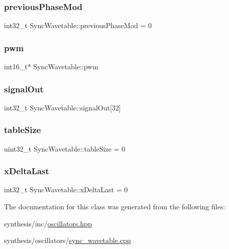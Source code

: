 \subsubsection{\texorpdfstring{previous\+Phase\+Mod}{previousPhaseMod}}
{\footnotesize\ttfamily int32\+\_\+t Sync\+Wavetable\+::previous\+Phase\+Mod = 0\hspace{0.3cm}{\ttfamily [private]}}

\mbox{\label{class_sync_wavetable_a7a7fed16ef7013e5543616df1c4343a4}} 
\subsubsection{\texorpdfstring{pwm}{pwm}}
{\footnotesize\ttfamily int16\+\_\+t$\ast$ Sync\+Wavetable\+::pwm}

\mbox{\label{class_sync_wavetable_a8e641290c730b3c2600585a3907df688}} 
\subsubsection{\texorpdfstring{signal\+Out}{signalOut}}
{\footnotesize\ttfamily int32\+\_\+t Sync\+Wavetable\+::signal\+Out\mbox{[}32\mbox{]}}

\mbox{\label{class_sync_wavetable_aabb4534f741acf29d9b8e2e020a357b1}} 
\subsubsection{\texorpdfstring{table\+Size}{tableSize}}
{\footnotesize\ttfamily uint32\+\_\+t Sync\+Wavetable\+::table\+Size = 0}

\mbox{\label{class_sync_wavetable_af518f49664b075b32e1d415ee9f890e5}} 
\subsubsection{\texorpdfstring{x\+Delta\+Last}{xDeltaLast}}
{\footnotesize\ttfamily int32\+\_\+t Sync\+Wavetable\+::x\+Delta\+Last = 0}



The documentation for this class was generated from the following files\+:\begin{DoxyCompactItemize}
\item 
synthesis/inc/\mbox{\hyperlink{oscillators_8hpp}{oscillators.\+hpp}}\item 
synthesis/oscillators/\mbox{\hyperlink{sync__wavetable_8cpp}{sync\+\_\+wavetable.\+cpp}}\end{DoxyCompactItemize}
